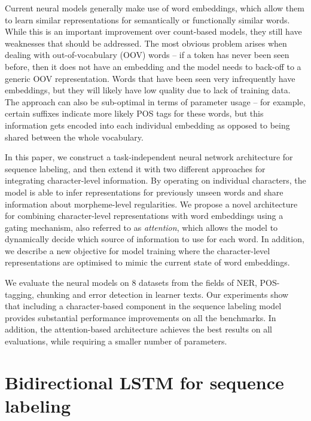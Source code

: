 \documentclass[11pt]{article}
\begin{document}
Current neural models generally make use of word embeddings, which allow them to learn similar representations for semantically or functionally similar words. While this is an important improvement over count-based models, they still have weaknesses that should be addressed. 
The most obvious problem arises when dealing with out-of-vocabulary (OOV) words -- if a token has never been seen before, then it does not have an embedding and the model needs to back-off to a generic OOV representation. Words that have been seen very infrequently have embeddings, but they will likely have low quality due to lack of training data. 
The approach can also be sub-optimal in terms of parameter usage -- for example, certain suffixes indicate more likely POS tags for these words, but this information gets encoded into each individual embedding as opposed to being shared between the whole vocabulary.

In this paper, we construct a task-independent neural network architecture for sequence labeling, and then extend it with two different approaches for integrating character-level information. By operating on individual characters, the model is able to infer representations for previously unseen words and share information about morpheme-level regularities. We propose a novel architecture for combining character-level representations with word embeddings using a gating mechanism, also referred to as \textit{attention}, which allows the model to dynamically decide which source of information to use for each word. In addition, we describe a new objective for model training where the character-level representations are optimised to mimic the current state of word embeddings.

We evaluate the neural models on 8 datasets from the fields of NER, POS-tagging, chunking and error detection in learner texts. Our experiments show that including a character-based component in the sequence labeling model provides substantial performance improvements on all the benchmarks. In addition, the attention-based architecture achieves the best results on all evaluations, while requiring a smaller number of parameters.












\section{Bidirectional LSTM for sequence labeling}
\label{sec:baseline}
\end{document}
